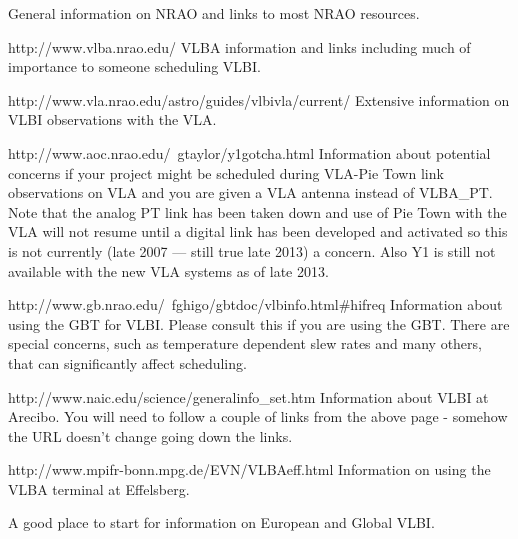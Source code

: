 \documentclass{report}
\begin{document}
\begin{list}{}{\parsep 0em  \itemsep 0em }

\item {}  General
information on NRAO and links to most NRAO resources.

\item {}
{http://www.vlba.nrao.edu/}  VLBA information and links
including much of importance to someone scheduling VLBI.

\item {}
{http://www.vla.nrao.edu/astro/guides/vlbivla/current/} Extensive
information on VLBI observations with the VLA.

\item {}
{http://www.aoc.nrao.edu/~gtaylor/y1gotcha.html} Information about
potential concerns if your project might be scheduled during VLA-Pie Town
link observations on VLA and you are given a VLA antenna instead of
VLBA\_PT.  Note that the analog PT link has been taken down and use of
Pie Town with the VLA will not resume until a digital link has been
developed and activated so this is not currently (late 2007 --- still true
late 2013) a concern.  Also Y1 is still not available with the new VLA
systems as of late 2013.

\item {}
{http://www.gb.nrao.edu/~fghigo/gbtdoc/vlbinfo.html\#hifreq}
Information about using the GBT for VLBI.  Please consult this
if you are using the GBT.  There are special concerns, such as temperature
dependent slew rates and many others, that can significantly affect
scheduling.

\item {}
{http://www.naic.edu/science/generalinfo_set.htm}
Information about VLBI at Arecibo.  You will need to follow a couple
of links from the above page - somehow the URL doesn't change going
down the links.

\item {}
{http://www.mpifr-bonn.mpg.de/EVN/VLBAeff.html}  Information on using
the VLBA terminal at Effelsberg.



\item {}  A good
place to start for information on European and Global VLBI.

\end{list}
\end{document}
